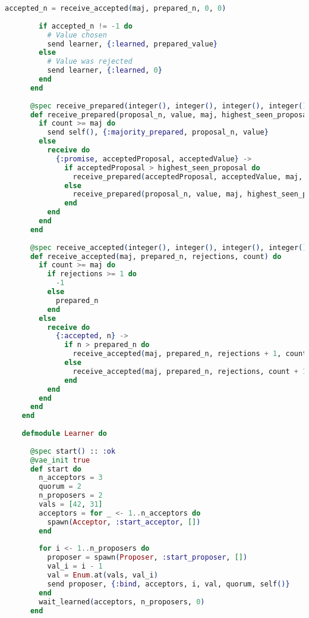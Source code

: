\begin{lstlisting}[language=Elixir, xleftmargin=.1\linewidth]
        accepted_n = receive_accepted(maj, prepared_n, 0, 0)
    
        if accepted_n != -1 do
          # Value chosen
          send learner, {:learned, prepared_value}
        else
          # Value was rejected
          send learner, {:learned, 0}
        end
      end
    
      @spec receive_prepared(integer(), integer(), integer(), integer(), integer()) :: :ok
      def receive_prepared(proposal_n, value, maj, highest_seen_proposal, count) do
        if count >= maj do
          send self(), {:majority_prepared, proposal_n, value}
        else
          receive do
            {:promise, acceptedProposal, acceptedValue} ->
              if acceptedProposal > highest_seen_proposal do
                receive_prepared(acceptedProposal, acceptedValue, maj, acceptedProposal, count + 1) # BUG IS HERE
              else
                receive_prepared(proposal_n, value, maj, highest_seen_proposal, count + 1)
              end
          end
        end
      end
    
      @spec receive_accepted(integer(), integer(), integer(), integer()) :: integer()
      def receive_accepted(maj, prepared_n, rejections, count) do
        if count >= maj do
          if rejections >= 1 do
            -1
          else
            prepared_n
          end
        else
          receive do
            {:accepted, n} ->
              if n > prepared_n do
                receive_accepted(maj, prepared_n, rejections + 1, count + 1)
              else
                receive_accepted(maj, prepared_n, rejections, count + 1)
              end
          end
        end
      end
    end
    
    defmodule Learner do
    
      @spec start() :: :ok
      @vae_init true
      def start do
        n_acceptors = 3
        quorum = 2
        n_proposers = 2
        vals = [42, 31]
        acceptors = for _ <- 1..n_acceptors do
          spawn(Acceptor, :start_acceptor, [])
        end
    
        for i <- 1..n_proposers do
          proposer = spawn(Proposer, :start_proposer, [])
          val_i = i - 1
          val = Enum.at(vals, val_i)
          send proposer, {:bind, acceptors, i, val, quorum, self()}
        end
        wait_learned(acceptors, n_proposers, 0)
      end
    

\end{lstlisting}
